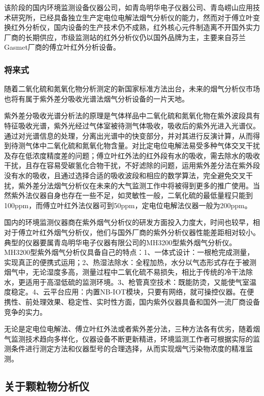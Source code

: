 \documentclass[]{book}
\begin{document}
该阶段的国内环境监测设备仪器公司，如青岛明华电子仪器公司、青岛崂山应用技术研究所，已经具备独立生产定电位电解法烟气分析仪的能力，然而对于傅立叶变换红外分析仪，国内设备的生产技术仍不成熟，红外核心元件制造离不开国外实力厂商的长期供应，市级监测站的红外分析仪仍以国外品牌为主，主要来自芬兰Gasmet厂商的傅立叶红外分析设备。

\hypertarget{ux5c06ux6765ux5f0f}{%
\subsubsection{将来式}\label{ux5c06ux6765ux5f0f}}

随着二氧化硫和氮氧化物分析测定的新国家标准方法出台，未来的烟气分析仪市场也将有属于紫外差分吸收光谱法烟气分析设备的一片天地。

紫外差分吸收光谱分析法的原理是气体样品中二氧化硫和氮氧化物在紫外波段具有特征吸收光谱，紫外光经过气体室被待测气体吸收，吸收后的紫外光进入光谱仪。通过对光谱信息的处理，分离出光谱中的快变部分，并对其进行反演计算，从而得到待测气体中二氧化硫和氮氧化物含量。对比定电位电解法易受多种气体交叉干扰及存在低浓度精度差的问题；傅立叶红外法的红外段有水的吸收，需去除水的吸收干扰，且存在容易受碳氢化合物干扰，不好滤除的问题，运用紫外差分法在紫外段没有水的吸收，且通过选择合适的吸收波段和相应的数学算法，完全避免交叉干扰，紫外差分法烟气分析仪在未来的大气监测工作中将被得到更多的推广使用。当然紫外法仪器自身也存在一些不足，如灵敏性一般，二氧化硫的最低量程只能到100ppm，而傅立叶红外法仪器可到50ppm，定电位电解法仪器一般为200ppm。

国内的环境监测仪器商在紫外烟气分析仪的研发方面投入力度大，时间也较早，相对于傅立叶红外烟气分析仪，他们与国外厂商的紫外分析仪器性能差距相对较小。典型的仪器要属青岛明华电子仪器有限公司的MH3200型紫外烟气分析仪。MH3200型紫外烟气分析仪具备自己的特点：1、一体式设计：一根枪完成测量，实现真正的便携式运用；2、热湿法除水：全程加热，水分以气态形式存在于被测烟气中，无论湿度多高，测量过程中二氧化硫不易损失，相比于传统的冷干法除水，更适用于高湿低硫的监测环境。3、枪管真空技术：既能防烫，又能使气室温度稳定。4、云平台应用：内置NB-IOT模块，只要有网络，就可操控仪器。在便携性、前处理效果、稳定性、实时性方面，国内紫外仪器具备和国外一流厂商设备竞争的实力。

无论是定电位电解法、傅立叶红外法或者紫外差分法，三种方法各有优劣，随着烟气监测技术趋向多样化，仪器设备不断更新精进，环境监测工作者可根据实际的监测条件进行测定方法和仪器型号的合理选择，从而实现烟气污染物浓度的精准监测。

\hypertarget{ux5173ux4e8eux9897ux7c92ux7269ux5206ux6790ux4eea}{%
\subsection{关于颗粒物分析仪}\label{ux5173ux4e8eux9897ux7c92ux7269ux5206ux6790ux4eea}}
\end{document}
